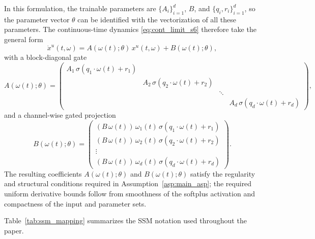 \documentclass[11pt]{amsart}
\numberwithin{equation}{section} %
\theoremstyle{remark}
\begin{document}
In this formulation, the trainable parameters are $\{A_i\}_{i=1}^d$, $B$, and $\{q_i,r_i\}_{i=1}^d$, so the parameter vector $\theta$ can be identified with the vectorization of all these parameters. The continuous-time dynamics \eqref{eq:cont_limit_s6} therefore take the general form
\[
    \dot{x}^u(t, \omega) = A(\omega(t);\theta)\,x^u(t, \omega) + B(\omega(t);\theta),
\]
with a block-diagonal gate
\[
    A(\omega(t);\theta)
    =
    \begin{pmatrix}
        A_1\, \sigma({q}_1 \cdot \omega(t) + {r}_1)
         &                                                      &        &                                                      \\
         & A_2\, \sigma({q}_2 \cdot \omega(t) + {r}_2)
         &                                                      &                                                               \\
         &                                                      & \ddots &                                                      \\
         &                                                      &        & A_d\, \sigma({q}_d \cdot \omega(t) + {r}_d)
    \end{pmatrix},
\]
and a channel-wise gated projection
\[
    B(\omega(t);\theta)
    =
    \begin{pmatrix}
        (B\,\omega(t))\,\omega_1(t)\,
        \sigma({q}_1 \cdot \omega(t) + {r}_1)
        \\[0.4em]
        (B\,\omega(t))\,\omega_2(t)\,
        \sigma({q}_2 \cdot \omega(t) + {r}_2)
        \\
        \vdots
        \\
        (B\,\omega(t))\,\omega_d(t)\,
        \sigma({q}_d \cdot \omega(t) + {r}_d)
    \end{pmatrix}.
\]
The resulting coefficients $A(\omega(t);\theta)$ and $B(\omega(t);\theta)$ satisfy the regularity and structural conditions required in Assumption~\ref{asp:main_asp}; the required uniform derivative bounds follow from smoothness of the softplus activation and compactness of the input and parameter sets.

Table~\ref{tab:ssm_mapping} summarizes the SSM notation used throughout the paper.
\end{document}
